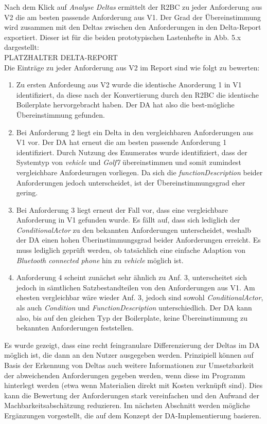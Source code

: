 \documentclass[12pt]{report}
\begin{document}
Nach dem Klick auf \textit{Analyse Deltas} ermittelt der R2BC zu jeder Anforderung aus V2 die am besten passende Anforderung aus V1. Der Grad der Übereinstimmung wird zusammen mit den Deltas zwischen den Anforderungen in den Delta-Report exportiert. Dieser ist für die beiden prototypischen Lastenhefte in Abb. 5.x dargestellt:
\\
PLATZHALTER DELTA-REPORT
\\
Die Einträge zu jeder Anforderung aus V2 im Report sind wie folgt zu bewerten:
\begin{enumerate}
\item Zu ersten Anfordeung aus V2 wurde die identische Anorderung 1 in V1 identifiziert, da diese nach der Konvertierung durch den R2BC die identische Boilerplate hervorgebracht haben. Der DA hat also die best-mögliche Übereinstimmung gefunden.
\item Bei Anforderung 2 liegt ein Delta in den vergleichbaren Anforderungen aus V1 vor. Der DA hat erneut die am besten passende Anforderung 1 identifiziert. Durch Nutzung des Enumerates wurde identifiziert, dass der Systemtyp von \textit{vehicle} und \textit{Golf7} übereinstimmen und somit zumindest vergleichbare Anfordeurngen vorliegen. Da sich die \textit{functionDescription} beider Anforderungen jedoch unterscheidet, ist der Übereinstimmungsgrad eher gering.
\item Bei Anforderung 3 liegt erneut der Fall vor, dass eine vergleichbare Anforderung in V1 gefunden wurde. Es fällt auf, dass sich lediglich der \textit{ConditionalActor} zu den bekannten Anforderungen unterscheidet, weshalb der DA einen hohen Überinstimmungsgrad beider Anforderungen erreicht. Es muss lediglich geprüft werden, ob tatsächlich eine einfache Adaption von \textit{Bluetooth connected phone} hin zu \textit{vehicle} möglich ist.
\item Anforderung 4 scheint zunächst sehr ähnlich zu Anf. 3, unterscheitet sich jedoch in sämtlichen Satzbestandteilen von den Anforderungen aus V1. Am ehesten vergleichbar wäre wieder Anf. 3, jedoch sind sowohl \textit{ConditionalActor}, als auch \textit{Condition} und \textit{FunctionDescription} unterschiedlich. Der DA kann also, bis auf den gleichen Typ der Boilerplate, keine Übereinstimmung zu bekannten Anforderungen feststellen.
\end{enumerate}

Es wurde gezeigt, dass eine recht feingranulare Differenzierung der Deltas im DA möglich ist, die dann an den Nutzer ausgegeben werden. Prinzipiell können auf Basis der Erkennung von Deltas auch weitere Informationen zur Umsetzbarkeit der abweichenden Anforderungen gegeben werden, wenn diese im Programm hinterlegt werden (etwa wenn Materialien direkt mit Kosten verknüpft sind). 
Dies kann die Bewertung der Anforderungen stark vereinfachen und den Aufwand der Machbarkeitsabschätzung reduzieren.
Im nächsten Abschnitt werden mögliche Ergänzungen vorgestellt, die auf dem Konzept der DA-Implementierung basieren.
\end{document}
